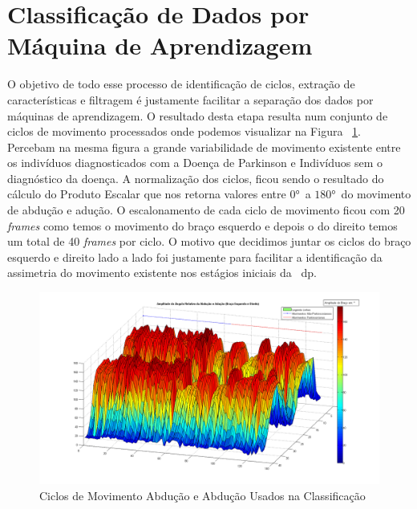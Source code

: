 



\section{Classificação de Dados por Máquina de Aprendizagem}\label{section:class_dados}
O objetivo de todo esse processo de identificação de ciclos, extração de características e filtragem é justamente facilitar a separação dos dados por máquinas de aprendizagem. O resultado desta etapa resulta num conjunto de ciclos de movimento processados onde podemos visualizar na Figura ~\ref{fig:ciclos_movimento_processados_filtrados}. Percebam na mesma figura a grande variabilidade de movimento existente entre os indivíduos diagnosticados com a Doença de Parkinson e Indivíduos sem o diagnóstico da doença. A normalização dos ciclos, ficou sendo o resultado do cálculo do Produto Escalar que nos retorna valores entre $ 0° $\ a $ 180° $\ do movimento de abdução e adução. O escalonamento de cada ciclo de movimento ficou com 20 \textit{frames} como temos o movimento do braço esquerdo e depois o do direito temos um total de 40 \textit{frames} por ciclo. O motivo que decidimos juntar os ciclos do braço esquerdo e direito lado a lado foi justamente para facilitar a identificação da assimetria do movimento 
existente nos estágios iniciais da ~\ac{dp}.

\begin{figure}[!htbp]
 \centering
 \includegraphics[scale=0.38]{./img/ciclosmovimentokinnect.png}
 \caption{Ciclos de Movimento Abdução e Abdução Usados na Classificação}
 \label{fig:ciclos_movimento_processados_filtrados}
\end{figure}



